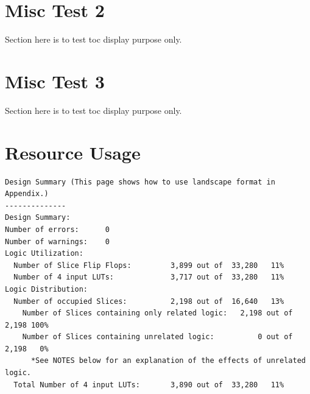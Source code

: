 \section{Misc Test 2}
Section here is to test toc display purpose only.
\section{Misc Test 3}
Section here is to test toc display purpose only.

\section{Resource Usage \label{cha:appendixC}}
\begin{landscape}
\begin{verbatim}
Design Summary (This page shows how to use landscape format in Appendix.)
--------------
Design Summary:
Number of errors:      0
Number of warnings:    0
Logic Utilization:
  Number of Slice Flip Flops:         3,899 out of  33,280   11%
  Number of 4 input LUTs:             3,717 out of  33,280   11%
Logic Distribution:
  Number of occupied Slices:          2,198 out of  16,640   13%
    Number of Slices containing only related logic:   2,198 out of   2,198 100%
    Number of Slices containing unrelated logic:          0 out of   2,198   0%
      *See NOTES below for an explanation of the effects of unrelated logic.
  Total Number of 4 input LUTs:       3,890 out of  33,280   11%
\end{verbatim}
\end{landscape}


